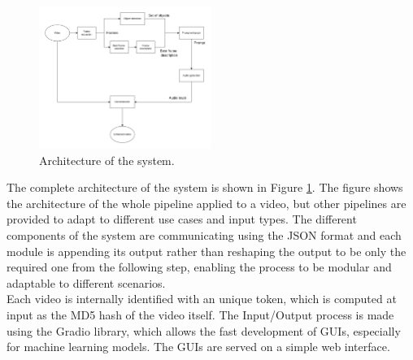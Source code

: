 \documentclass[conference]{IEEEtran}
\begin{document}
\begin{figure}[h]
    \centerline{\includegraphics[width=0.5\textwidth]{final_architecture.png}}
    \caption{Architecture of the system.}
    \label{architecture}
\end{figure}
The complete architecture of the system is shown in Figure \ref{architecture}.
The figure shows the architecture of the whole pipeline applied to a video,
but other pipelines are provided to adapt to different use cases and input types.
The different components of the system are communicating using the JSON format and each module is appending its output rather than reshaping the output to be only the required one from the following step, enabling the process to be modular and adaptable to different scenarios.\\
Each video is internally identified with an unique token, which is computed at input as the MD5 hash of the video itself. 
The Input/Output process is made using the Gradio \cite{Gradio} library, which allows the fast development of GUIs, especially for machine learning models. The GUIs are served on a simple web interface.
 
\end{document}
